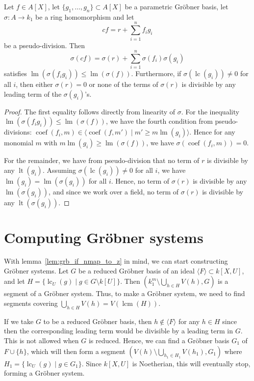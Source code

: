 \documentclass[a4paper, 12pt]{article}
\DeclareMathOperator{\LT}{lt}
\DeclareMathOperator{\LM}{lm}
\DeclareMathOperator{\LC}{lc}
\DeclareMathOperator{\coef}{coef}
\DeclareMathOperator{\lcm}{lcm}
\theoremstyle{changedot}
\theoremstyle{changedotbreak}
\theoremstyle{nonumberplain}
\newtheorem{proof}{Proof}
\begin{document}
\begin{lemma}\label{lem:ps_div_to_div}
  Let $f \in A[X]$, let $\{g_{1}, \dots, g_{n}\} \subset A[X]$ be a parametric Gröbner basis, let $\sigma : A \to k_{1}$ be a ring homomorphism and let
  \[cf = r + \sum_{i=1}^{n}f_{i}g_{i}\]
  be a pseudo-division. Then
  \[\sigma(cf) = \sigma(r) + \sum_{i=1}^{n} \sigma(f_{i})\sigma(g_{i})\]
  satisfies $\LM(\sigma(f_{i} g_{i})) \leq \LM(\sigma(f))$. Furthermore, if $\sigma(\LC(g_{i})) \neq 0$ for all $i$, then either $\sigma(r) = 0$ or none of the terms of $\sigma(r)$ is divisible by any leading term of the $\sigma(g_{i})$'s.
\end{lemma}
\begin{proof}
  The first equality follows directly from linearity of $\sigma$. For the inequality $\LM(\sigma(f_{i} g_{i})) \leq \LM(\sigma(f))$, we have the fourth condition from pseudo-divisions: $\coef(f_{i}, m) \in \langle \coef(f, m') \mid m' \geq m \LM(g_{i}) \rangle$. Hence for any monomial $m$ with $m\LM(g_{i}) \geq \LM(\sigma(f))$, we have $\sigma(\coef(f_{i}, m)) = 0$.

  For the remainder, we have from pseudo-division that no term of $r$ is divisible by any $\LT(g_{i})$. Assuming $\sigma(\LC(g_{i})) \neq 0$ for all $i$, we have $\LM(g_{i}) = \LM(\sigma(g_{i}))$ for all $i$. Hence, no term of $\sigma(r)$ is divisible by any $\LM(\sigma(g_{i}))$, and since we work over a field, no term of $\sigma(r)$ is divisible by any $\LT(\sigma(g_{i}))$.
\end{proof}



\section{Computing Gröbner systems}

With lemma~\ref{lem:grb_if_nmap_to_z} in mind, we can start constructing Gröbner systems. Let $G$ be a reduced Gröbner basis of an ideal $\langle F \rangle \subset k[X, U]$, and let $H = \{\LC_{U}(g) \mid g \in G \setminus k[U]\}$. Then $\left(k_{1}^{m} \setminus \bigcup_{h \in H} V(h), G\right)$ is a segment of a Gröbner system. Thus, to make a Gröbner system, we need to find segments covering $\bigcup_{h \in H} V(h) = V(\lcm(H))$.

If we take $G$ to be a reduced Gröbner basis, then $h \notin \langle F \rangle$ for any $h \in H$ since then the corresponding leading term would be divisible by a leading term in $G$. This is not allowed when $G$ is reduced. Hence, we can find a Gröbner basis $G_{1}$ of $F \cup \{h\}$, which will then form a segment $(V(h) \setminus \bigcup_{h_{1} \in H_{1}} V(h_{1}), G_{1})$ where $H_{1} = \{\LC_{U}(g) \mid g \in G_{1}\}$. Since $k[X, U]$ is Noetherian, this will eventually stop, forming a Gröbner system.
\end{document}
